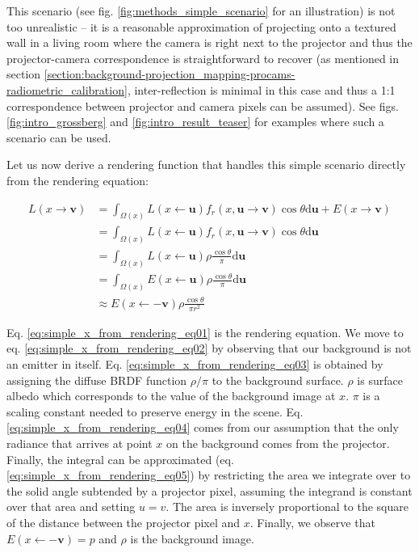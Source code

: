 This scenario (see fig. \ref{fig:methods_simple_scenario} for an illustration) is not too unrealistic -- it is a reasonable approximation of projecting onto a textured wall in a living room where the camera is right next to the projector and thus the projector-camera correspondence is straightforward to recover (as mentioned in section \ref{section:background-projection_mapping-procams-radiometric_calibration}, inter-reflection is minimal in this case and thus a 1:1 correspondence between projector and camera pixels can be assumed). See figs. \ref{fig:intro_grossberg} and \ref{fig:intro_result_teaser} for examples where such a scenario can be used.

Let us now derive a rendering function that handles this simple scenario directly from the rendering equation:

\begin{align}
    L(x \rightarrow \mathbf{v}) &= \int_{\Omega(x)} L(x \leftarrow \mathbf{u}) f_r(x, \mathbf{u} \rightarrow \mathbf{v}) \cos \theta \mathrm{d}\mathbf{u} + E(x \rightarrow \mathbf{v}) \label{eq:simple_x_from_rendering_eq01} \\
    &= \int_{\Omega(x)} L(x \leftarrow \mathbf{u}) f_r(x, \mathbf{u} \rightarrow \mathbf{v}) \cos \theta \mathrm{d}\mathbf{u} \label{eq:simple_x_from_rendering_eq02} \\
    &= \int_{\Omega(x)} L(x \leftarrow \mathbf{u}) \rho \frac{\cos \theta}{\pi} \mathrm{d}\mathbf{u} \label{eq:simple_x_from_rendering_eq03} \\
    &= \int_{\Omega(x)} E(x \leftarrow \mathbf{u}) \rho \frac{\cos \theta}{\pi} \mathrm{d}\mathbf{u} \label{eq:simple_x_from_rendering_eq04} \\
    &\approx E(x \leftarrow \mathbf{-v}) \rho \frac{\cos \theta}{\pi r^2} \label{eq:simple_x_from_rendering_eq05}
\end{align}

Eq. \ref{eq:simple_x_from_rendering_eq01} is the rendering equation. We move to eq. \ref{eq:simple_x_from_rendering_eq02} by observing that our background is not an emitter in itself. Eq. \ref{eq:simple_x_from_rendering_eq03} is obtained by assigning the diffuse BRDF function \(\rho / \pi\) to the background surface. \(\rho\) is surface albedo which corresponds to the value of the background image at \(x\). \(\pi\) is a scaling constant needed to preserve energy in the scene. Eq. \ref{eq:simple_x_from_rendering_eq04} comes from our assumption that the only radiance that arrives at point \(x\) on the background comes from the projector. Finally, the integral can be approximated (eq. \ref{eq:simple_x_from_rendering_eq05}) by restricting the area we integrate over to the solid angle subtended by a projector pixel, assuming the integrand is constant over that area and setting \(u = v\). The area is inversely proportional to the square of the distance between the projector pixel and \(x\). Finally, we observe that \(E(x \leftarrow \mathbf{-v}) = p\) and \(\rho\) is the background image.

